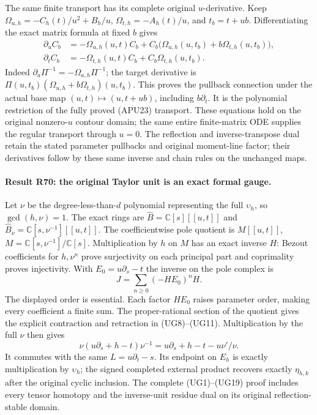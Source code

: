 The same finite transport has its complete original
\(u\)-derivative. Keep \(\Omega_{u,h}=-C_h(t)/u^2+B_h/u\),
\(\Omega_{t,h}=-A_h(t)/u\), and \(t_b=t+ub\).
Differentiating the exact matrix formula at fixed \(b\) gives
\[
 \begin{aligned}
 \partial_u C_b&=-\Omega_{u,h}(u,t)C_b+
 C_b\bigl(\Omega_{u,h}(u,t_b)+b\Omega_{t,h}(u,t_b)\bigr),\\
 \partial_t C_b&=-\Omega_{t,h}(u,t)C_b+
                          C_b\Omega_{t,h}(u,t_b).
 \end{aligned}
\]
Indeed \(\partial_a\Pi^{-1}=-\Omega_{a,h}\Pi^{-1}\);
the target derivative is
\(\Pi(u,t_b)(\Omega_{u,h}+b\Omega_{t,h})(u,t_b)\).
This proves the pullback connection under the actual base map
\((u,t)\mapsto(u,t+ub)\), including \(b\partial_t\).
It is the polynomial restriction of the fully proved (APU23)
transport. These equations hold on the original nonzero-\(u\)
contour domain; the same entire finite-matrix ODE supplies the
regular transport through \(u=0\). The reflection and
inverse-transpose dual retain the stated parameter pullbacks
and original moment-line factor; their derivatives follow by
these same inverse and chain rules on the unchanged maps.

\paragraph{Result R70: the original Taylor unit is an exact formal gauge.}
Let $\nu$ be the degree-less-than-$d$ polynomial representing
the full $\upsilon_h$, so $\gcd(h,\nu)=1$. The exact rings are
$\widehat B=\mathbb C[s][[u,t]]$ and
$\widehat B_\nu=\mathbb C[s,\nu^{-1}][[u,t]]$.
The coefficientwise pole quotient is
$M[[u,t]]$, $M=\mathbb C[s,\nu^{-1}]/\mathbb C[s]$.
Multiplication by $h$ on $M$ has an exact inverse $H$:
Bezout coefficients for $h,\nu^n$ prove surjectivity on each
principal part and coprimality proves injectivity.
With $E_0=u\partial_s-t$ the inverse on the pole complex is
\[
J=\sum_{n\ge0}(-HE_0)^nH.
\]
The displayed order is essential. Each factor $HE_0$ raises
parameter order, making every coefficient a finite sum.
The proper-rational section of the quotient gives the explicit
contraction and retraction in (UG8)--(UG11). Multiplication
by the full $\nu$ then gives
\[
\nu(u\partial_s+h-t)\nu^{-1}
=u\partial_s+h-t-u\nu'/\nu.
\]
It commutes with the same $L=u\partial_t-s$. Its endpoint
on $E_h$ is exactly multiplication by $\upsilon_h$; the
signed completed external product recovers exactly
$\eta_{h,k}$ after the original cyclic inclusion.
The complete (UG1)--(UG19) proof includes every tensor
homotopy and the inverse-unit residue dual on its original
reflection-stable domain.

